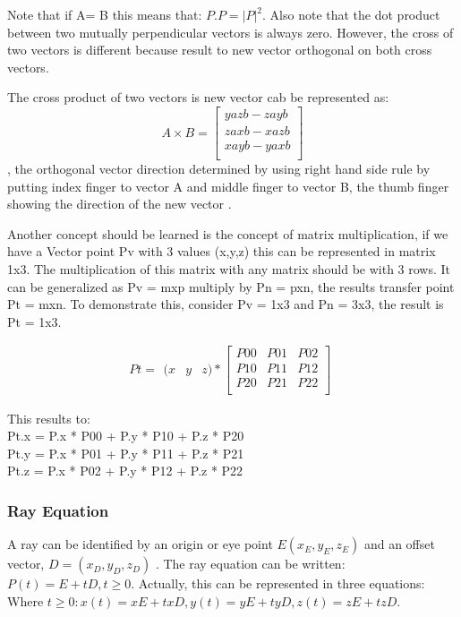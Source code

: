 \documentclass[a4paper, 12pt]{article}
\begin{document}
Note that if A= B this means that: $P.P={|P|}^2$. Also note that the dot product between two mutually perpendicular vectors is always zero. However, the cross of two vectors is different because result to new vector orthogonal on both cross vectors.

The cross product of two vectors is new vector cab be represented as: $$A\times B=\left[\begin{matrix}yazb - zayb \\ zaxb - xazb \\ xayb - yaxb \\\end{matrix}\right]$$, the orthogonal vector direction determined by using right hand side rule by putting index finger to vector A and middle finger to vector B, the thumb finger showing the direction of the new vector \cite{Ray tracing primitives}.

Another concept should be learned is the concept of matrix multiplication, if we have a Vector point Pv with 3 values (x,y,z) this can be represented in matrix 1x3. The  multiplication of this matrix with any matrix should be with 3 rows. It can be generalized as  Pv = mxp multiply by Pn = pxn, the results transfer point Pt = mxn. To demonstrate this, consider Pv = 1x3 and Pn = 3x3, the result is Pt = 1x3.

$$Pt = \begin{matrix} (x&y&z)*\left[\begin{matrix}P00&P01&P02\\P10&P11&P12\\P20&P21&P22\\\end{matrix}\right]\end{matrix}$$

This results to:\\
Pt.x = P.x * P00 + P.y * P10 + P.z * P20 \\
Pt.y = P.x * P01 + P.y * P11 + P.z * P21 \\
Pt.z = P.x * P02 + P.y * P12 + P.z * P22 \cite{Learn Computer Graphics From Scratch}

\subsubsection{Ray Equation}
A ray can be identified by an origin or eye point $E(x_E,y_E,z_E)$ and an offset vector, $D=(x_D,y_D,z_D)$ . The ray equation can be written: $P(t)=E+tD, t\geq 0$.
Actually, this can be represented in three equations: Where $ t \geq 0: x(t)=xE+txD, y(t)=yE+tyD, z(t)=zE+tzD$.
\end{document}
